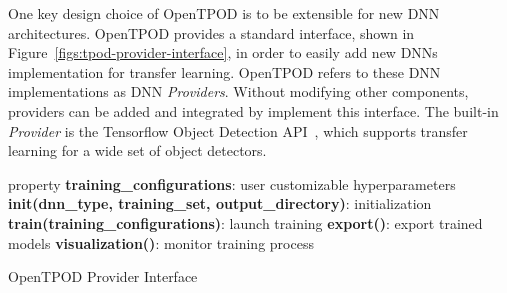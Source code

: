 One key design choice of OpenTPOD is to be extensible for new DNN architectures.
OpenTPOD provides a standard interface, shown in
Figure~\ref{figs:tpod-provider-interface}, in order to easily add new DNNs
implementation for transfer learning. OpenTPOD refers to these DNN implementations
as DNN \textit{Providers}. Without modifying other components, providers can be
added and integrated by implement this interface. The built-in \textit{Provider}
is the Tensorflow Object Detection API~\cite{tfod2019}, which supports transfer
learning for a wide set of object detectors. 


\begin{algorithm} 
\SetAlgoLined
 property \textbf{training\_configurations}: user customizable hyperparameters\;
 \textbf{init(dnn\_type, training\_set, output\_directory)}: initialization\;
 \textbf{train(training\_configurations)}: launch training\;
 \textbf{export()}: export trained models\;
 \textbf{visualization()}: monitor training process\;
\caption{OpenTPOD Provider Interface}
\label{figs:tpod-provider-interface}
\end{algorithm}